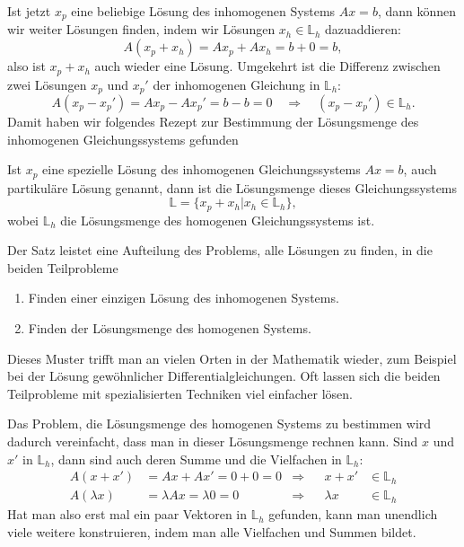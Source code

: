 Ist jetzt $x_p$ eine beliebige Lösung des inhomogenen Systems $Ax=b$, dann
können wir weiter Lösungen finden, indem wir Lösungen $x_h\in\mathbb L_h$
dazuaddieren:
\[
A(x_p+x_h)=Ax_p+Ax_h=b+0=b,
\]
also ist $x_p+x_h$ auch wieder eine Lösung.
Umgekehrt ist die Differenz
zwischen zwei Lösungen $x_p$ und $x_p'$ der inhomogenen Gleichung in
$\mathbb L_h$:
\[
A(x_p-x_p')=Ax_p-Ax_p'=b-b=0\quad\Rightarrow\quad (x_p-x_p')\in\mathbb L_h.
\]
Damit haben wir folgendes Rezept zur Bestimmung der Lösungsmenge des
inhomogenen Gleichungssystems gefunden
\begin{satz}
Ist $x_p$ eine spezielle Lösung des inhomogenen Gleichungssystems $Ax=b$,
auch partikuläre Lösung genannt,
dann ist die Lösungsmenge dieses Gleichungssystems 
\[
\mathbb L=\{x_p+x_h|x_h\in\mathbb L_h\},
\]
wobei $\mathbb L_h$ die Lösungsmenge des homogenen Gleichungssystems ist.
\end{satz}
Der Satz leistet eine Aufteilung des Problems, alle Lösungen zu finden,
in die beiden Teilprobleme
\begin{enumerate}
\item Finden einer einzigen Lösung des inhomogenen Systems.
\item Finden der Lösungsmenge des homogenen Systems.
\end{enumerate}
Dieses Muster trifft man an vielen Orten in der Mathematik wieder, zum
Beispiel bei der Lösung gewöhnlicher Differentialgleichungen.
Oft lassen sich die beiden Teilprobleme mit spezialisierten Techniken
viel einfacher lösen.

Das Problem, die Lösungsmenge des homogenen Systems zu bestimmen wird
dadurch vereinfacht, dass man in dieser Lösungsmenge rechnen kann.
Sind $x$ und $x'$  in $\mathbb L_h$, dann sind auch deren Summe und
die Vielfachen in $\mathbb L_h$:
\begin{align*}
A(x+x')&=Ax+Ax'=0+0=0&\Rightarrow&&x+x'&\in\mathbb L_h\\
A(\lambda x)&=\lambda Ax=\lambda 0=0&\Rightarrow&&\lambda x&\in \mathbb L_h
\end{align*}
Hat man also erst mal ein paar Vektoren in $\mathbb L_h$ gefunden, kann
man unendlich viele weitere konstruieren, indem man alle Vielfachen und Summen
bildet.

